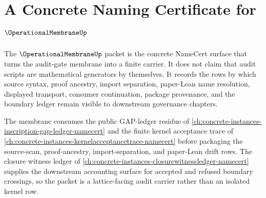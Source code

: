\chapter{A Concrete Naming Certificate for $\OperationalMembraneUp$}
\label{ch:concrete-instances-operationalmembrane-namecert}

The $\OperationalMembraneUp$ packet is the concrete NameCert surface that turns the audit-gate membrane into a finite carrier. It does not claim that audit scripts are mathematical generators by themselves. It records the rows by which source syntax, proof ancestry, import separation, paper-Lean name resolution, displayed transport, consumer continuation, package provenance, and the boundary ledger remain visible to downstream governance chapters.

The membrane consumes the public GAP-ledger residue of \autoref{ch:concrete-instances-inscription-gap-ledger-namecert} and the finite kernel acceptance trace of \autoref{ch:concrete-instances-kernelacceptancetrace-namecert} before packaging the source-scan, proof-ancestry, import-separation, and paper-Lean drift rows. The closure witness ledger of \autoref{ch:concrete-instances-closurewitnessledger-namecert} supplies the downstream accounting surface for accepted and refused boundary crossings, so the packet is a lattice-facing audit carrier rather than an isolated kernel row.

